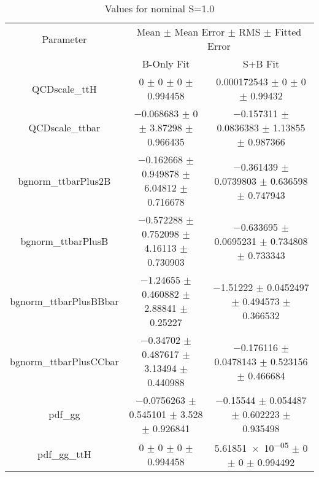 \begin{table}
\centering
\caption{Values for nominal S=1.0}
\begin{tabular}{ccc}
\toprule
Parameter & \multicolumn{2}{c}{Mean $\pm$ Mean Error $\pm$ RMS $\pm$ Fitted Error}\\
 & B-Only Fit & S+B Fit\\
\midrule
QCDscale\_ttH & \num{0} $\pm$ \num{0} $\pm$ \num{0} $\pm$ \num{0.994458} & \num{0.000172543} $\pm$ \num{0} $\pm$ \num{0} $\pm$ \num{0.99432}\\
QCDscale\_ttbar & \num{-0.068683} $\pm$ \num{0} $\pm$ \num{3.87298} $\pm$ \num{0.966435} & \num{-0.157311} $\pm$ \num{0.0836383} $\pm$ \num{1.13855} $\pm$ \num{0.987366}\\
bgnorm\_ttbarPlus2B & \num{-0.162668} $\pm$ \num{0.949878} $\pm$ \num{6.04812} $\pm$ \num{0.716678} & \num{-0.361439} $\pm$ \num{0.0739803} $\pm$ \num{0.636598} $\pm$ \num{0.747943}\\
bgnorm\_ttbarPlusB & \num{-0.572288} $\pm$ \num{0.752098} $\pm$ \num{4.16113} $\pm$ \num{0.730903} & \num{-0.633695} $\pm$ \num{0.0695231} $\pm$ \num{0.734808} $\pm$ \num{0.733343}\\
bgnorm\_ttbarPlusBBbar & \num{-1.24655} $\pm$ \num{0.460882} $\pm$ \num{2.88841} $\pm$ \num{0.25227} & \num{-1.51222} $\pm$ \num{0.0452497} $\pm$ \num{0.494573} $\pm$ \num{0.366532}\\
bgnorm\_ttbarPlusCCbar & \num{-0.34702} $\pm$ \num{0.487617} $\pm$ \num{3.13494} $\pm$ \num{0.440988} & \num{-0.176116} $\pm$ \num{0.0478143} $\pm$ \num{0.523156} $\pm$ \num{0.466684}\\
pdf\_gg & \num{-0.0756263} $\pm$ \num{0.545101} $\pm$ \num{3.528} $\pm$ \num{0.926841} & \num{-0.15544} $\pm$ \num{0.054487} $\pm$ \num{0.602223} $\pm$ \num{0.935498}\\
pdf\_gg\_ttH & \num{0} $\pm$ \num{0} $\pm$ \num{0} $\pm$ \num{0.994458} & \num{5.61851e-05} $\pm$ \num{0} $\pm$ \num{0} $\pm$ \num{0.994492}\\
\bottomrule
\end{tabular}
\end{table}